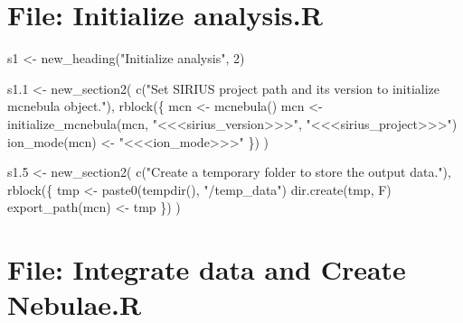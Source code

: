 \documentclass[
]{article}
\newenvironment{Shaded}{\begin{snugshade}}{\end{snugshade}}
\newcommand{\DecValTok}[1]{\textcolor[rgb]{0.00,0.00,0.81}{#1}}
\newcommand{\FloatTok}[1]{\textcolor[rgb]{0.00,0.00,0.81}{#1}}
\newcommand{\FunctionTok}[1]{\textcolor[rgb]{0.00,0.00,0.00}{#1}}
\newcommand{\NormalTok}[1]{#1}
\newcommand{\OtherTok}[1]{\textcolor[rgb]{0.56,0.35,0.01}{#1}}
\newcommand{\StringTok}[1]{\textcolor[rgb]{0.31,0.60,0.02}{#1}}
\begin{document}
\hypertarget{file-initialize-analysis.r}{%
\section{File: Initialize analysis.R}\label{file-initialize-analysis.r}}

\begin{Shaded}
\begin{Highlighting}[]
\NormalTok{s1 }\OtherTok{\textless{}{-}} \FunctionTok{new\_heading}\NormalTok{(}\StringTok{"Initialize analysis"}\NormalTok{, }\DecValTok{2}\NormalTok{)}

\NormalTok{s1}\FloatTok{.1} \OtherTok{\textless{}{-}} \FunctionTok{new\_section2}\NormalTok{(}
  \FunctionTok{c}\NormalTok{(}\StringTok{"Set SIRIUS project path and its version to initialize mcnebula object."}\NormalTok{),}
  \FunctionTok{rblock}\NormalTok{(\{}
\NormalTok{    mcn }\OtherTok{\textless{}{-}} \FunctionTok{mcnebula}\NormalTok{()}
\NormalTok{    mcn }\OtherTok{\textless{}{-}} \FunctionTok{initialize\_mcnebula}\NormalTok{(mcn, }\StringTok{"\textless{}\textless{}\textless{}sirius\_version\textgreater{}\textgreater{}\textgreater{}"}\NormalTok{, }\StringTok{"\textless{}\textless{}\textless{}sirius\_project\textgreater{}\textgreater{}\textgreater{}"}\NormalTok{)}
    \FunctionTok{ion\_mode}\NormalTok{(mcn) }\OtherTok{\textless{}{-}} \StringTok{"\textless{}\textless{}\textless{}ion\_mode\textgreater{}\textgreater{}\textgreater{}"}
\NormalTok{  \})}
\NormalTok{)}

\NormalTok{s1}\FloatTok{.5} \OtherTok{\textless{}{-}} \FunctionTok{new\_section2}\NormalTok{(}
  \FunctionTok{c}\NormalTok{(}\StringTok{"Create a temporary folder to store the output data."}\NormalTok{),}
  \FunctionTok{rblock}\NormalTok{(\{}
\NormalTok{    tmp }\OtherTok{\textless{}{-}} \FunctionTok{paste0}\NormalTok{(}\FunctionTok{tempdir}\NormalTok{(), }\StringTok{"/temp\_data"}\NormalTok{)}
    \FunctionTok{dir.create}\NormalTok{(tmp, F)}
    \FunctionTok{export\_path}\NormalTok{(mcn) }\OtherTok{\textless{}{-}}\NormalTok{ tmp}
\NormalTok{  \})}
\NormalTok{)}
\end{Highlighting}
\end{Shaded}

\hypertarget{file-integrate-data-and-create-nebulae.r}{%
\section{File: Integrate data and Create Nebulae.R}\label{file-integrate-data-and-create-nebulae.r}}
\end{document}
